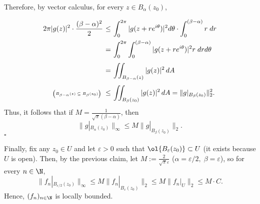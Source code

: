 Therefore, by vector calculus, for every $z \in B_\alpha(z_0)$,
\[ \everymath{\displaystyle}
\arraycolsep=1.8pt\def\arraystretch{2.5}
\begin{array}{rcl}
    2\pi |g(z)|^2 \cdot \frac{ (\beta - \alpha)^2}{2} & \leq & \int_{0}^{2\pi} |g(z + r e^{i\theta })|^2 d\theta \cdot \int_{0}^{(\beta - \alpha)}r\; dr\\
    & = & \int_{0}^{2\pi}\int_{0}^{(\beta - \alpha)} |g(z + r e^{i\theta })|^2 r\; dr d\theta\\
    & = & \iint_{B_{\beta - \alpha}(z)} |g(z)|^2\, dA\\
    \mbox{\tiny $\left( B_{\beta - \alpha}(z) \subseteq B_{\beta}(z_0) \right)$ }& \leq & \iint_{B_{\beta}(z_0)} |g(z)|^2\, dA = \|g|_{B_\beta(z_0)}\|_2^2.
\end{array} \]
Thus, it follows that if $M = \frac{1}{\sqrt{\pi}(\beta-\alpha)}$, then
\[ \|g|_{B_\alpha (z_0)}\|_\infty \leq M \|g|_{B_\beta (z_0)}\|_2.\]
$ $\hfill $\square$

Finally, fix any $z_0 \in U$ and let $\varepsilon > 0$ such that $\ol{B_\varepsilon(z_0)} \subset U$ (it exists because $U$ is open). Then, by the previous claim, let $M := \frac{2}{\sqrt{\pi} \varepsilon}$ ($\alpha = \varepsilon/2,\; \beta = \varepsilon$), so for every $n \in \N$,
\[ \|f_n|_{B_{\varepsilon/2} (z_0)}\|_\infty \leq M \|f_n|_{B_{\varepsilon} (z_0)}\|_2 \leq M  \|f_n|_{U}\|_2 \leq M \cdot C.\]
Hence, $(f_n)_{n\in\N}$ is locally bounded.